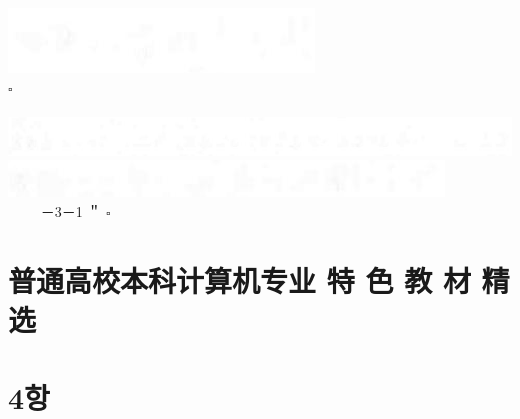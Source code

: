 \documentclass[10pt]{article}
\begin{document}
\includegraphics[max width=\textwidth, center]{2025_06_06_704745ea57b15b2333e5g-111(4)}\\
$\square$\\
$\qquad$\\
\includegraphics[max width=\textwidth, center]{2025_06_06_704745ea57b15b2333e5g-111(15)}\\
\includegraphics[max width=\textwidth, center]{2025_06_06_704745ea57b15b2333e5g-111(13)}\\
$\qquad$ －3－1 ＂ $\square$

\section*{普通高校本科计算机专业 特 色 教 材 精 选}
\section*{4항}
\end{document}
